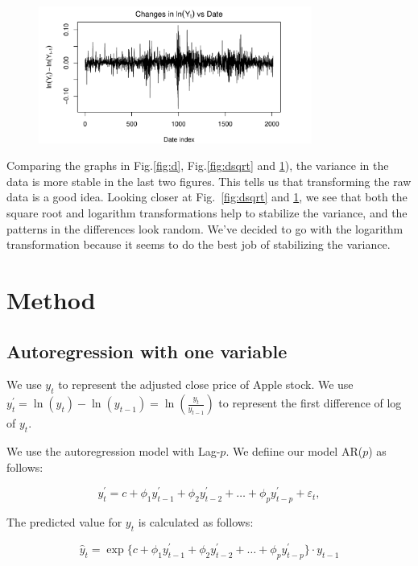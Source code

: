 \documentclass[conference,onecolumn,11pt]{IEEEtran}
\begin{document}
\begin{figure}[htpb]
	\centering
	\includegraphics[width=0.8\textwidth]{pic/log_AdjClosed.pdf}
	\caption{}
	\label{fig:dlog}
\end{figure}

Comparing the graphs in Fig.\ref{fig:d}, Fig.\ref{fig:dsqrt} and \ref{fig:dlog}), the variance in the data is more stable in the last two figures. This tells us that transforming the raw data is a good idea. Looking closer at Fig.~\ref{fig:dsqrt} and \ref{fig:dlog}, we see that both the square root and logarithm transformations help to stabilize the variance, and the patterns in the differences look random. We've decided to go with the logarithm transformation because it seems to do the best job of stabilizing the variance.


\section{Method}

\subsection*{Autoregression with one variable}\label{mod1}

We use $y_{t}$ to represent the adjusted close price of Apple stock.
We use $y^{'}_{t} = \ln(y_{t})-\ln(y_{t-1}) = \ln(\frac{y_{t}}{y_{t-1}})$ to represent the first difference of log of $y_{t}$.

We use the autoregression model with Lag-$p$. We defiine our model AR($p$) as follows:

\[
y^{'}_{t} = c + \phi_{1}y^{'}_{t-1} + \phi_{2}y^{'}_{t-2} + \dots + \phi_{p}y^{'}_{t-p} + \varepsilon_{t},
\]

The predicted value for $y_t$ is calculated as follows:

\[
\hat{y}_t = \exp\{c + \phi_{1}y^{'}_{t-1} + \phi_{2}y^{'}_{t-2} + \dots + \phi_{p}y^{'}_{t-p}\}\cdot y_{t-1}
\]
\end{document}
